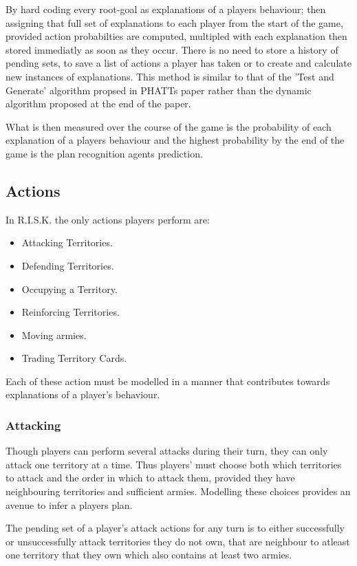 \documentclass[parskip]{cs4rep}
\begin{document}
By hard coding every root-goal as explanations of a players behaviour; then assigning that full set of explanations to each player from the start of the game, provided action probabilties are computed, multipled with each explanation then stored immediatly as soon as they occur. There is no need to store a history of pending sets, to save a list of actions a player has taken or to create and calculate new instances of explanations. This method is similar to that of the 'Test and Generate' algorithm propsed in PHATTs paper rather than the dynamic algorithm proposed at the end of the paper.

What is then measured over the course of the game is the probability of each explanation of a players behaviour and the highest probability by the end of the game is the plan recognition agents prediction.

\subsection{Actions}

In R.I.S.K. the only actions players perform are:

\begin{itemize}
\item
Attacking Territories.
\item
Defending Territories.
\item
Occupying a Territory.
\item
Reinforcing Territories.
\item
Moving armies.
\item
Trading Territory Cards.
\end{itemize}

Each of these action must be modelled in a manner that contributes towards explanations of a player's behaviour.

\subsubsection{Attacking}

Though players can perform several attacks during their turn, they can only attack one territory at a time. Thus players' must choose both which territories to attack and the order in which to attack them, provided they have neighbouring territories and sufficient armies. Modelling these choices provides an avenue to infer a players plan.

The pending set of a player's attack actions for any turn is to either successfully or unsuccessfully attack territories they do not own, that are neighbour to atleast one territory that they own which also contains at least two armies.
\end{document}
